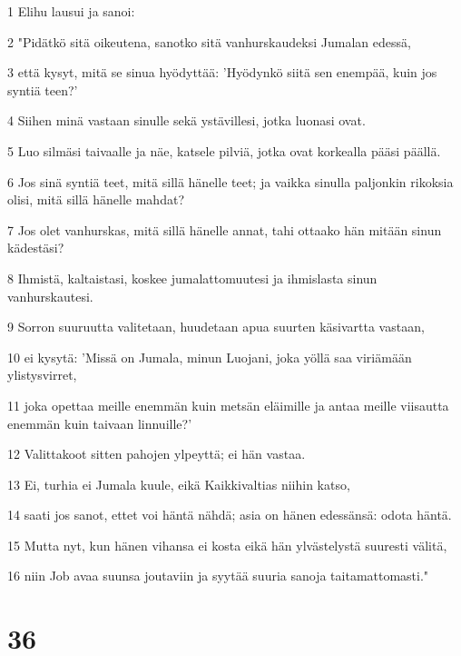 \par 1 Elihu lausui ja sanoi:
\par 2 "Pidätkö sitä oikeutena, sanotko sitä vanhurskaudeksi Jumalan edessä,
\par 3 että kysyt, mitä se sinua hyödyttää: 'Hyödynkö siitä sen enempää, kuin jos syntiä teen?'
\par 4 Siihen minä vastaan sinulle sekä ystävillesi, jotka luonasi ovat.
\par 5 Luo silmäsi taivaalle ja näe, katsele pilviä, jotka ovat korkealla pääsi päällä.
\par 6 Jos sinä syntiä teet, mitä sillä hänelle teet; ja vaikka sinulla paljonkin rikoksia olisi, mitä sillä hänelle mahdat?
\par 7 Jos olet vanhurskas, mitä sillä hänelle annat, tahi ottaako hän mitään sinun kädestäsi?
\par 8 Ihmistä, kaltaistasi, koskee jumalattomuutesi ja ihmislasta sinun vanhurskautesi.
\par 9 Sorron suuruutta valitetaan, huudetaan apua suurten käsivartta vastaan,
\par 10 ei kysytä: 'Missä on Jumala, minun Luojani, joka yöllä saa viriämään ylistysvirret,
\par 11 joka opettaa meille enemmän kuin metsän eläimille ja antaa meille viisautta enemmän kuin taivaan linnuille?'
\par 12 Valittakoot sitten pahojen ylpeyttä; ei hän vastaa.
\par 13 Ei, turhia ei Jumala kuule, eikä Kaikkivaltias niihin katso,
\par 14 saati jos sanot, ettet voi häntä nähdä; asia on hänen edessänsä: odota häntä.
\par 15 Mutta nyt, kun hänen vihansa ei kosta eikä hän ylvästelystä suuresti välitä,
\par 16 niin Job avaa suunsa joutaviin ja syytää suuria sanoja taitamattomasti."

\chapter{36}

